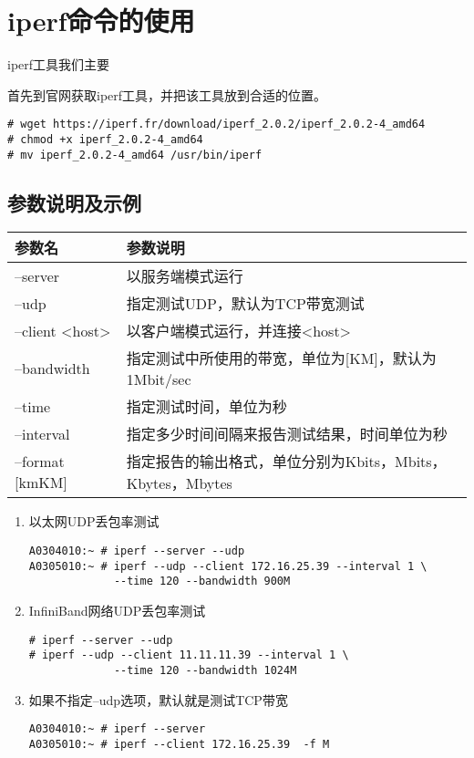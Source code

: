 \section{iperf命令的使用}
\label{sec:iperfCmd}

iperf工具我们主要

首先到官网获取iperf工具，并把该工具放到合适的位置。
\begin{verbatim}
# wget https://iperf.fr/download/iperf_2.0.2/iperf_2.0.2-4_amd64
# chmod +x iperf_2.0.2-4_amd64
# mv iperf_2.0.2-4_amd64 /usr/bin/iperf
\end{verbatim}

\subsection{参数说明及示例}

\begin{tabular}{lp{25em}}
  \toprule
  参数名       & 参数说明 \\
  \midrule
  --server	& 以服务端模式运行 \\
  --udp	        & 指定测试UDP，默认为TCP带宽测试 \\
  --client <host>	& 以客户端模式运行，并连接<host> \\
  --bandwidth	& 指定测试中所使用的带宽，单位为[KM]，默认为1Mbit/sec \\
  --time	        & 指定测试时间，单位为秒 \\
  --interval	& 指定多少时间间隔来报告测试结果，时间单位为秒 \\
  --format [kmKM]	& 指定报告的输出格式，单位分别为Kbits，Mbits，Kbytes，Mbytes \\
\bottomrule
\end{tabular}

\begin{enumerate}[itemsep=0pt,parsep=0pt]
\item 以太网UDP丢包率测试

\begin{verbatim}
A0304010:~ # iperf --server --udp 
A0305010:~ # iperf --udp --client 172.16.25.39 --interval 1 \
             --time 120 --bandwidth 900M
\end{verbatim}

\item InfiniBand网络UDP丢包率测试

\begin{verbatim}
# iperf --server --udp 
# iperf --udp --client 11.11.11.39 --interval 1 \
             --time 120 --bandwidth 1024M
\end{verbatim}

\item 如果不指定--udp选项，默认就是测试TCP带宽

\begin{verbatim}
A0304010:~ # iperf --server 
A0305010:~ # iperf --client 172.16.25.39  -f M
\end{verbatim}
\end{enumerate}

